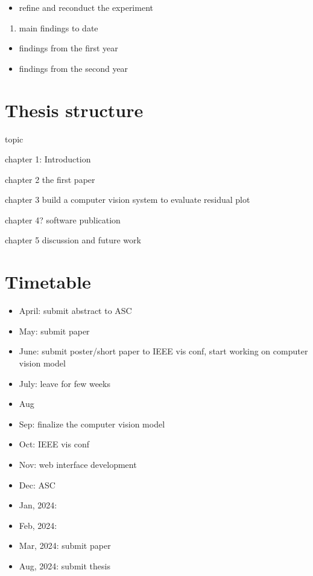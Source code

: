 \documentclass[11pt,a4paper,]{article}
\providecommand{\tightlist}{%
  \setlength{\itemsep}{0pt}\setlength{\parskip}{0pt}}
\begin{document}
\begin{itemize}
\tightlist
\item
  refine and reconduct the experiment
\end{itemize}

\begin{enumerate}
\def\labelenumi{\arabic{enumi}.}
\setcounter{enumi}{4}
\tightlist
\item
  main findings to date
\end{enumerate}

\begin{itemize}
\tightlist
\item
  findings from the first year
\item
  findings from the second year
\end{itemize}

\hypertarget{thesis-structure}{%
\section{Thesis structure}\label{thesis-structure}}

topic

chapter 1: Introduction

chapter 2
the first paper

chapter 3
build a computer vision system to evaluate residual plot

chapter 4?
software publication

chapter 5
discussion and future work

\hypertarget{timetable}{%
\section{Timetable}\label{timetable}}

\begin{itemize}
\item
  April: submit abstract to ASC
\item
  May: submit paper
\item
  June: submit poster/short paper to IEEE vis conf, start working on computer vision model
\item
  July: leave for few weeks
\item
  Aug
\item
  Sep: finalize the computer vision model
\item
  Oct: IEEE vis conf
\item
  Nov: web interface development
\item
  Dec: ASC
\item
  Jan, 2024:
\item
  Feb, 2024:
\item
  Mar, 2024: submit paper
\item
  Aug, 2024: submit thesis
\end{itemize}
\end{document}
